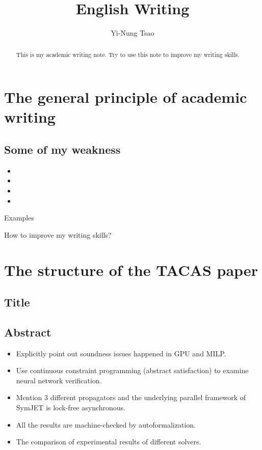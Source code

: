 \documentclass[a4paper]{report}
\author{Yi-Nung Tsao}
\title{English Writing}
\begin{document}
\maketitle

\begin{abstract}
	This is my academic writing note. Try to use this note to improve my writing skills. 
\end{abstract}

\newpage

\tableofcontents

\chapter{The general principle of academic writing}
\section{Some of my weakness}

\begin{itemize}
\item 
\item 
\item 
\item 
\end{itemize}

Examples 



How to improve my writing skills?



\chapter{The structure of the TACAS paper}
\section{Title}


\section{Abstract}
\begin{itemize}
\item Explicitly point out soundness issues happened in GPU and MILP.
\item Use continuous constraint programming (abstract satisfaction) to examine neural network verification.
\item Mention 3 different propagators and the underlying parallel framework of SymJET is lock-free asynchronous.
\item All the results are machine-checked by autoformalization. 
\item The comparison of experimental results of different solvers.  
\end{itemize}
\end{document}
